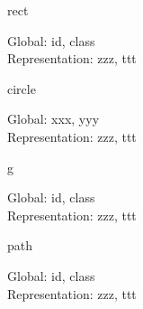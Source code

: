 

\maketitle
\noindent

\begin{Element}{rect}
    \begin{Required}
    \end{Required}
    \begin{Optional}
        Global: id, class\\
        Representation: zzz, ttt
    \end{Optional}
\end{Element}
\begin{Element}{circle}
    \begin{Required}
    \end{Required}
    \begin{Optional}
        Global: xxx, yyy\\
        Representation: zzz, ttt
    \end{Optional}
\end{Element}

\begin{Element}{g}
    \begin{Required}
    \end{Required}
    \begin{Optional}
        Global: id, class\\
        Representation: zzz, ttt
    \end{Optional}
\end{Element}

\begin{Element}{path}
    \begin{Required}
    \end{Required}
    \begin{Optional}
        Global: id, class\\
        Representation: zzz, ttt
    \end{Optional}
\end{Element}

